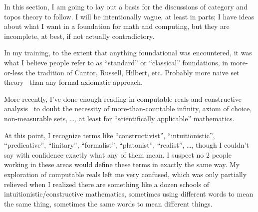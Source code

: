 \documentclass[11pt,openany]{article}
\begin{document}
In this section, I am going to lay out a basis for
the discussions of category and topos theory to follow. 
I will be intentionally vague, at least in parts;
I have ideas about what I want in a foundation 
for math and computing, but they are incomplete, at best,
if not actually contradictory.

In my training, to the extent that anything 
foundational was encountered,
it was what I believe people refer to as ``standard'' or
``classical'' foundations,
in more-or-less the tradition of Cantor, Russell, Hilbert, etc.
Probably more naive set theory~\cite{Halmos1960Naive} 
than any formal axiomatic approach.

More recently, I've done enough reading in 
computable reals and constructive 
analysis~\cite{henle:2012:numbers,Bridger:2019}
to doubt the necessity of more-than-countable infinity,
axiom of choice, non-measurable sets, {\ldots},
at least for ``scientifically applicable'' 
mathematics.~\cite{feferman1989CantorNecessary,
feferman1992LongWay}

At this point, I recognize terms like
``constructivist'', ``intuitionistic'', ``predicative'', 
``finitary'', ``formalist'', ``platonist'', ``realist'', {\ldots},
though I couldn't say with confidence exactly what any of them
mean. 
I suspect no $2$ people working in these areas would define these
terms in exactly the same way.
My exploration of computable reals left me very confused,
which was only partially relieved when I realized there are 
something like a dozen schools of intuitionistic/constructive
mathematics, sometimes using different words to mean the
same thing, sometimes the same words to mean different things.

\label{sec:good-foundation}
\end{document}
